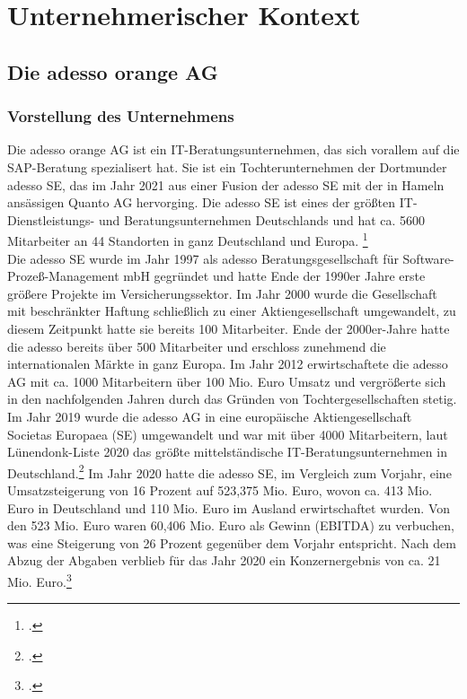 \section{Unternehmerischer Kontext}
\subsection{Die adesso orange AG}
\subsubsection{Vorstellung des Unternehmens}
Die adesso orange AG ist ein IT-Beratungsunternehmen, das sich vorallem auf die SAP-Beratung spezialisert hat. Sie ist ein Tochterunternehmen der Dortmunder adesso SE, das im Jahr 2021 aus einer Fusion der adesso SE mit der in Hameln ansässigen Quanto AG hervorging. Die adesso SE ist eines der größten IT-Dienstleistungs- und Beratungsunternehmen Deutschlands und hat ca. 5600 Mitarbeiter an 44 Standorten in ganz Deutschland und Europa. \footcite[Vgl.][]{adesso-main} \\Die adesso SE wurde im Jahr 1997 als \glqq{}adesso Beratungsgesellschaft für Software-Prozeß-Management mbH\grqq{} gegründet und hatte Ende der 1990er Jahre erste größere Projekte im Versicherungssektor. Im Jahr 2000 wurde die Gesellschaft mit beschränkter Haftung schließlich zu einer Aktiengesellschaft umgewandelt, zu diesem Zeitpunkt hatte sie bereits 100 Mitarbeiter. Ende der 2000er-Jahre hatte die adesso bereits über 500 Mitarbeiter und erschloss zunehmend die internationalen Märkte in ganz Europa. Im Jahr 2012 erwirtschaftete die adesso AG mit ca. 1000 Mitarbeitern über 100 Mio. Euro Umsatz und vergrößerte sich in den nachfolgenden Jahren durch das Gründen von Tochtergesellschaften stetig. Im Jahr 2019 wurde die adesso AG in eine europäische Aktiengesellschaft \glqq{}Societas Europaea\grqq{} (SE) umgewandelt und war mit über 4000 Mitarbeitern, laut \glqq{}Lünendonk-Liste 2020\grqq{} das größte mittelständische IT-Beratungsunternehmen in Deutschland.\footcite[Vgl.][]{adesso-historie} Im Jahr 2020 hatte die adesso SE, im Vergleich zum Vorjahr, eine Umsatzsteigerung von 16 Prozent auf 523,375 Mio. Euro, wovon ca. 413 Mio. Euro in Deutschland und 110 Mio. Euro im Ausland erwirtschaftet wurden. Von den 523 Mio. Euro waren 60,406 Mio. Euro als Gewinn (EBITDA) zu verbuchen, was eine Steigerung von 26 Prozent gegenüber dem Vorjahr entspricht. Nach dem Abzug der Abgaben verblieb für das Jahr 2020 ein Konzernergebnis von ca. 21 Mio. Euro.\footcite[Vgl.][]{adesso2020-report}
